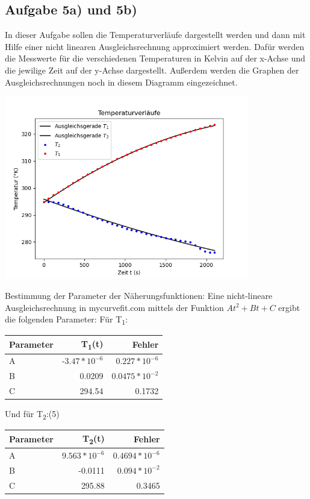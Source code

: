 \documentclass[titlepage=firstcover, captions=tableheading]{scrartcl}
\begin{document}
\subsection{Aufgabe 5a) und 5b)}   

In dieser Aufgabe sollen die Temperaturverläufe dargestellt werden und dann mit Hilfe einer nicht linearen Ausgleichsrechnung approximiert werden. 
Dafür werden die Messwerte für die verschiedenen Temperaturen in Kelvin auf der x-Achse und die jewilige Zeit auf der y-Achse dargestellt. 
Außerdem werden die Graphen der Ausgleichsrechnungen noch in diesem Diagramm eingezeichnet.

\begin{center}
    \includegraphics[height=8cm]{plot2.png}
\end{center}
Bestimmung der Parameter der Näherungsfunktionen: 
Eine nicht-lineare Ausgleichsrechnung in mycurvefit.com mittels der Funktion $At^2+Bt+C$ ergibt die folgenden Parameter: 
Für T\textsubscript{1}:

\begin{center}
    
\begin{tabular}{
    l
    r
    @{${}\pm{}$}
    r
}
    \toprule
    {Parameter} & {T\textsubscript{1}(t)} & {Fehler} \\
    \midrule
    A & -$3.47 * 10^{-6}$ &  $0.227 *10^{-6}$ \\
    B &  0.0209&  $0.0475 * 10^{-2} $ \\
    C & 294.54 &  0.1732 \\
    \bottomrule
\end{tabular}
\end{center}

Und für T\textsubscript{2}:(5)

\begin{center}
\begin{tabular}{
    l
    r
    @{${}\pm{}$}
    r
}
    \toprule
    {Parameter} & {T\textsubscript{2}(t)} & {Fehler} \\
    \midrule
    A & $9.563 * 10^{-6} $ &  $0.4694 * 10^{-6} $ \\
    B &  -0.0111&  $ 0.094 * 10^{-2} $ \\
    C & 295.88 &  0.3465 \\
    \bottomrule
\end{tabular}
\end{center}
\end{document}
